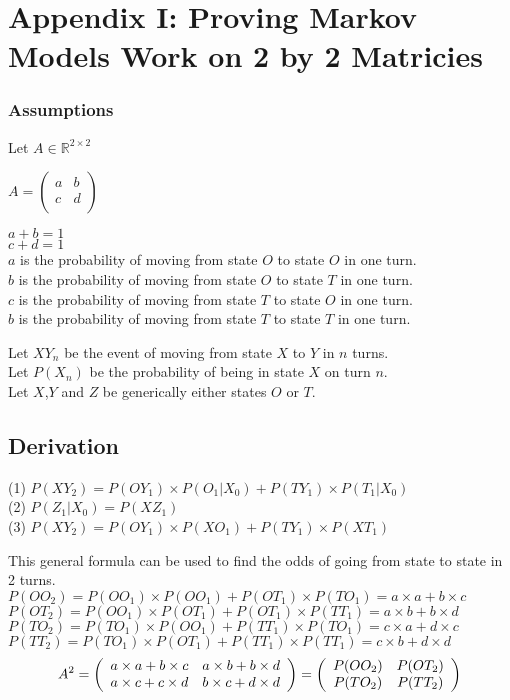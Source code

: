 \section{Appendix I: Proving Markov Models Work on 2 by 2 Matricies}
\subsubsection{Assumptions}

Let $A \in \mathbb{R}^{2\times2}$

$A =
\begin{pmatrix}
  a & b\\
  c & d\\
\end{pmatrix}
$

$a+b=1$\\
$c+d=1$\\
$a$ is the probability of moving from state $O$ to state $O$ in one turn.\\
$b$ is the probability of moving from state $O$ to state $T$ in one turn.\\
$c$ is the probability of moving from state $T$ to state $O$ in one turn.\\
$b$ is the probability of moving from state $T$ to state $T$ in one turn.

Let $XY_n$ be the event of moving from state $X$ to $Y$ in $n$ turns. \\
Let $P(X_n)$ be the probability of being in state $X$ on turn $n$.\\
Let $X$,$Y$ and $Z$ be generically either states $O$ or $T$.

\subsection{Derivation}

(1) $P(XY_2) = P(OY_1) \times P(O_1|X_0)+P(TY_1) \times P(T_1|X_0)$\\
(2) $P(Z_1|X_0) = P(XZ_1)$\\
(3) $P(XY_2) = P(OY_1) \times P(XO_1)+P(TY_1) \times P(XT_1)$

This general formula can be used to find the odds of going from state to state in 2 turns.\\
$P(OO_2) = P(OO_1) \times P(OO_1)+P(OT_1) \times P(TO_1) = a \times a + b \times c$\\
$P(OT_2) = P(OO_1) \times P(OT_1)+P(OT_1) \times P(TT_1) = a \times b + b \times d$\\
$P(TO_2) = P(TO_1) \times P(OO_1)+P(TT_1) \times P(TO_1) = c \times a + d \times c$\\
$P(TT_2) = P(TO_1) \times P(OT_1)+P(TT_1) \times P(TT_1) = c \times b + d \times d$
\[
A^2 =
\left(
\begin{array}{c c}
a \times a+b \times c & a \times b+b \times d \\
a \times c+c \times d & b \times c+d \times d \\
\end{array}
\right)
=
\left(
\begin{array}{c c}
P(OO_2) & P(OT_2) \\
P(TO_2) & P(TT_2) \\
\end{array}
\right) \]


